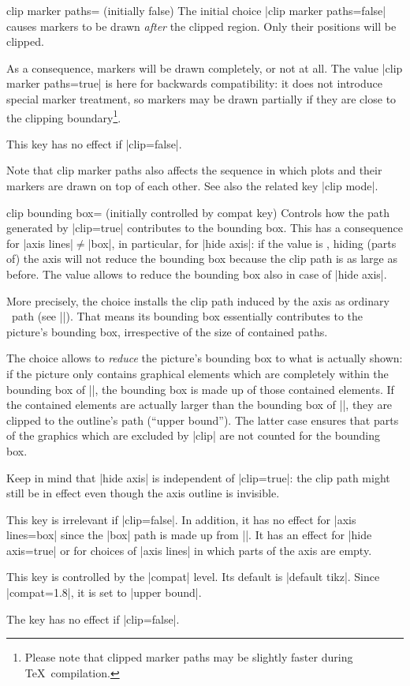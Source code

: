 \begin{pgfplotskey}{clip marker paths= (initially false)}
	The initial choice |clip marker paths=false| causes markers to be drawn \emph{after} the clipped region. Only their positions will be clipped.
	
	As a consequence, markers will be drawn completely, or not at all. The value |clip marker paths=true| is here for backwards compatibility: it does not introduce special marker treatment, so markers may be drawn partially if they are close to the clipping boundary\footnote{Please note that clipped marker paths may be slightly faster during \TeX\ compilation.}.

	This key has no effect if |clip=false|.

	Note that clip marker paths also affects the sequence in which plots and their markers are drawn on top of each other. See also the related key |clip mode|.
\end{pgfplotskey}

\begin{pgfplotskey}{clip bounding box= (initially controlled by compat key)}
	Controls how the path generated by |clip=true| contributes to the bounding box. This has a consequence for |axis lines|$\neq$|box|, in particular, for |hide axis|: if the value is , hiding (parts of) the axis will not reduce the bounding box because the clip path is as large as before. The value  allows to reduce the bounding box also in case of |hide axis|.

	More precisely, the choice  installs the clip path induced by the axis  as ordinary \tikzname\ path (see |\pgfplotspathaxisoutline|). That means its bounding box essentially contributes to the picture's bounding box, irrespective of the size of contained paths.

	The choice  allows to \emph{reduce} the picture's bounding box to what is actually shown: if the picture only contains graphical elements which are completely within the bounding box of |\pgfplotspathaxisoutline|, the bounding box is made up of those contained elements. If the contained elements are actually larger than the bounding box of |\pgfplotspathaxisoutline|, they are clipped to the outline's path (``upper bound''). The latter case ensures that parts of the graphics which are excluded by |clip| are not counted for the bounding box.

	Keep in mind that |hide axis| is independent of |clip=true|: the clip path might still be in effect even though the axis outline is invisible.

	This key is irrelevant if |clip=false|. In addition, it has no effect for |axis lines=box| since the |box| path is made up from |\pgfplotspathaxisoutline|. It has an effect for |hide axis=true| or for choices of |axis lines| in which parts of the axis are empty.

	This key is controlled by the |compat| level. Its default is |default tikz|. Since |compat=1.8|, it is set to |upper bound|.

	The key has no effect if |clip=false|.
\end{pgfplotskey}

